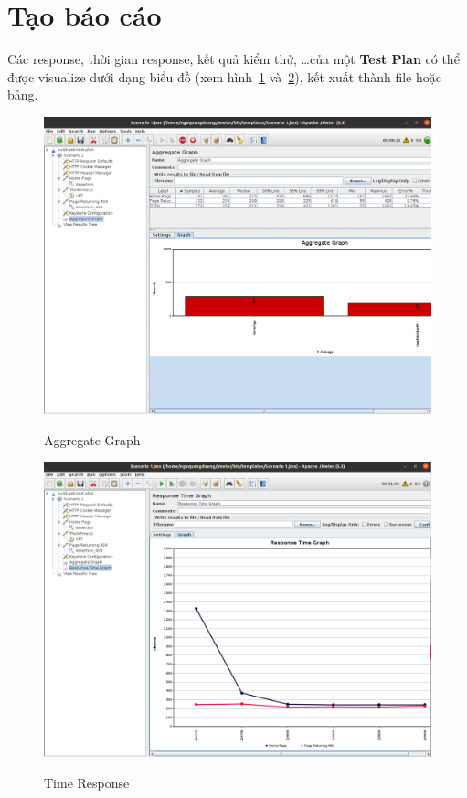 \documentclass[12pt]{report}
\begin{document}
\section{Tạo báo cáo}

\par Các response, thời gian response, kết quả kiểm thử, \ldots của một \textbf{Test Plan} có thể được visualize dưới dạng biểu đồ (xem hình~\ref{fig:aggregate} và~\ref{fig:time-response}), kết xuất thành file hoặc bảng.

\begin{figure}[htp]
    \centering
    \includegraphics[scale=0.3]{aggregate.png}
    \caption{Aggregate Graph}
    {\label{fig:aggregate}}
\end{figure}

\begin{figure}[htp]
    \centering
    \includegraphics[scale=0.3]{timeresponse.png}
    \caption{Time Response}
    {\label{fig:time-response}}
\end{figure}
\end{document}

